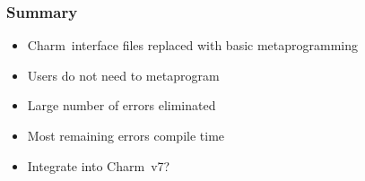 \documentclass[svgnames,tikz,serif,ragged2e]{beamer}
\newcommand\Charm{Charm\nolinebreak[4]\hspace{-.05em}\raisebox{.4ex}{\relsize{-3}{\textbf{++}}}}
\begin{document}
\begin{frame}
  \frametitle{Summary}
  \begin{itemize}
  \item \Charm~interface files replaced with basic metaprogramming
  \item Users do not need to metaprogram
  \item Large number of errors eliminated
  \item Most remaining errors compile time
  \item Integrate into \Charm~v7?
  \end{itemize}
\end{frame}
\end{document}
